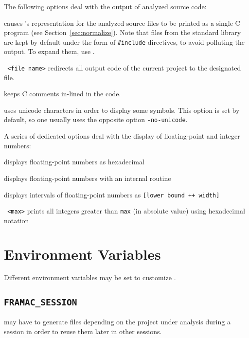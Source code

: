 The following options deal with the output of analyzed source code:
\begin{description}
\item {} causes \FramaC's representation for the analyzed
  source files to be printed as a single C program (see
  Section~\ref{sec:normalize}). Note that files from the \FramaC standard
  library are kept by default under the form of \texttt{\#include} directives,
  to avoid polluting the output. To expand them, use .
\item \texttt{ <file name>} redirects all output code of the
  current project to the designated file.
\item {} keeps C comments in-lined in the code.
\item {} uses unicode characters in order to display some
  \acsl symbols. This option is set by default, so one usually uses the opposite
  option \texttt{-no-unicode}.
\end{description}
A series of dedicated options deal with the display of floating-point and
integer numbers:
\begin{description}
\item {} displays floating-point
  numbers as hexadecimal
\item {} displays floating-point numbers
  with an internal routine
\item {} displays intervals of
  floating-point numbers as \texttt{[lower bound ++ width]}
\item \texttt{ <max>} prints all integers greater
  than \texttt{max} (in absolute value) using hexadecimal notation
\end{description}

\section{Environment Variables}\label{sec:env-variables}

Different environment variables may be set to customize \FramaC.

\subsection{\texttt{FRAMAC\_SESSION}}\label{sec:var-session}

\FramaC may have to generate files depending on the project under analysis
during a session in order to reuse them later in other sessions.

